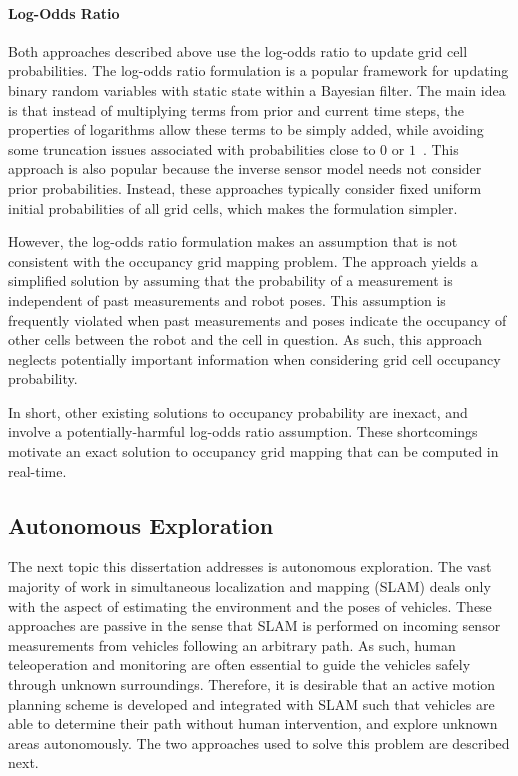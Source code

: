 \paragraph{Log-Odds Ratio} Both approaches described above use the log-odds ratio to update grid cell probabilities. The log-odds ratio formulation is a popular framework for updating binary random variables with static state within a Bayesian filter. The main idea is that instead of multiplying terms from prior and current time steps, the properties of logarithms allow these terms to be simply added, while avoiding some truncation issues associated with probabilities close to $0$ or $1$~\cite{ThrBurFox05}. This approach is also popular because the inverse sensor model needs not consider prior probabilities. Instead, these approaches typically consider fixed uniform initial probabilities of all grid cells, which makes the formulation simpler.

However, the log-odds ratio formulation makes an assumption that is not consistent with the occupancy grid mapping problem. The approach yields a simplified solution by assuming that the probability of a measurement is independent of past measurements and robot poses. This assumption is frequently violated when past measurements and poses indicate the occupancy of other cells between the robot and the cell in question. As such, this approach neglects potentially important information when considering grid cell occupancy probability.

In short, other existing solutions to occupancy probability are inexact, and involve a potentially-harmful log-odds ratio assumption. These shortcomings motivate an exact solution to occupancy grid mapping that can be computed in real-time.




\subsection{Autonomous Exploration}

The next topic this dissertation addresses is autonomous exploration. The vast majority of work in simultaneous localization and mapping (SLAM) deals only with the aspect of estimating the environment and the poses of vehicles. These approaches are passive in the sense that SLAM is performed on incoming sensor measurements from vehicles following an arbitrary path. As such, human teleoperation and monitoring are often essential to guide the vehicles safely through unknown surroundings. Therefore, it is desirable that an active motion planning scheme is developed and integrated with SLAM such that vehicles are able to determine their path without human intervention, and explore unknown areas autonomously. The two approaches used to solve this problem are described next.

